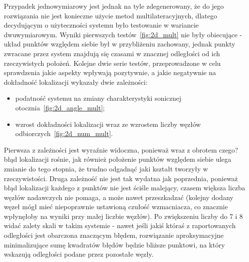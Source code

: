 Przypadek jednowymiarowy jest jednak na tyle zdegenerowany, że do jego rozwiązania nie jest konieczne użycie metod multilateracyjnych, dlatego decydującym o użyteczności systemu było testowanie w wariancie dwuwymiarowym. Wyniki pierwszych testów~\ref{fig:2d_mult} nie były obiecujące {-} układ punktów względem siebie był w przybliżeniu zachowany, jednak punkty zwracane przez system znajdują się czasami w znacznej odległości od ich rzeczywistych położeń. Kolejne dwie serie testów, przeprowadzone w celu sprawdzenia jakie aspekty wpływają pozytywnie, a jakie negatywnie na dokładność lokalizacji wykazały dwie zależności:
\begin{itemize}
    \item podatność systemu na zmiany charakterystyki sonicznej otocznia~\ref{fig:2d_angle_mult};
    \item wzrost dokładności lokalizacji wraz ze wzrostem liczby węzłów odbiorczych~\ref{fig:2d_num_mult}.
\end{itemize}
Pierwsza z zależności jest wyraźnie widoczna, ponieważ wraz z obrotem \color{blue}czego?\color{black} błąd lokalizacji rośnie, jak również położenie punktów względem siebie ulega zmianie do tego stopnia, że trudno odgadnąć jaki kształt tworzyły w rzeczywistości. Druga zależność nie jest tak wydatna jak poprzednia, ponieważ błąd lokalizacji każdego z punktów nie jest ściśle malejący, czasem większa liczba węzłów nadawczych nie pomaga, a może nawet przeszkadzać (kolejny dodany węzeł mógł mieć niepoprawnie ustawioną czułość wzmacniacza, co znacznie wpłynęłoby na wyniki przy małej liczbie węzłów). Po zwiększeniu liczby do 7 i 8 widać zalety skali w takim systemie {-} nawet jeśli jakiś któraś z raportowanych odległości jest obarczona znaczącym błędem, rozwiązanie aproksymacyjne minimalizujące sumę kwadratów błędów będzie bliższe punktowi, na który wskazują odległości podane przez pozostałe węzły.
